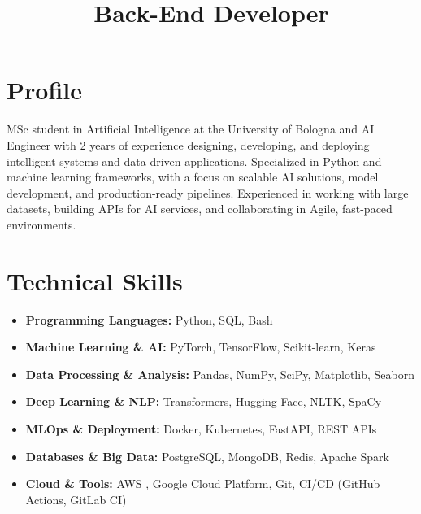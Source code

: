\documentclass[11pt,a4paper,sans]{moderncv}
\title{Back-End Developer} %
\begin{document}
\makecvtitle

\vspace {-2em}

\section{Profile}
\vspace{-1mm}
MSc student in Artificial Intelligence at the University of Bologna and AI Engineer with 2 years of experience designing, developing, and deploying intelligent systems and data-driven applications. Specialized in Python and machine learning frameworks, with a focus on scalable AI solutions, model development, and production-ready pipelines. Experienced in working with large datasets, building APIs for AI services, and collaborating in Agile, fast-paced environments.%

    
    


\section{Technical Skills}
\begin{itemize}
    \item \textbf{Programming Languages:} Python, SQL, Bash
    \item \textbf{Machine Learning \& AI:} PyTorch, TensorFlow, Scikit-learn, Keras
    \item \textbf{Data Processing \& Analysis:} Pandas, NumPy, SciPy, Matplotlib, Seaborn
    \item \textbf{Deep Learning \& NLP:} Transformers, Hugging Face, NLTK, SpaCy
    \item \textbf{MLOps \& Deployment:} Docker, Kubernetes, FastAPI, REST APIs
    \item \textbf{Databases \& Big Data:} PostgreSQL, MongoDB, Redis, Apache Spark
    \item \textbf{Cloud \& Tools:} AWS , Google Cloud Platform, Git, CI/CD (GitHub Actions, GitLab CI)
\end{itemize}
\end{document}
